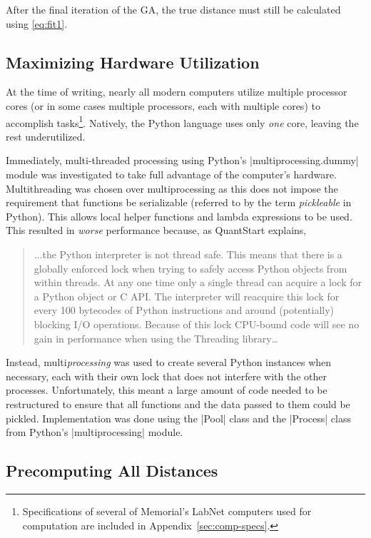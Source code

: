 After the final iteration of the GA, the true distance must still be calculated
using \eqref{eq:fit1}.

\subsection{Maximizing Hardware Utilization}
At the time of writing, nearly all modern computers utilize multiple processor
cores (or in some cases multiple processors, each with multiple cores) to 
accomplish tasks\footnote{Specifications of several of Memorial's LabNet 
computers used for computation are included in Appendix~\ref{sec:comp-specs}.}.
Natively, the Python language uses only {\em one} core, leaving the rest 
underutilized. 

Immediately, multi-threaded processing using Python's 
|multiprocessing.dummy| module was investigated to take full 
advantage of the computer's hardware. Multithreading was chosen over
multiprocessing as this does not impose the requirement that functions 
be serializable (referred to by the term {\em pickleable} in Python). This 
allows local helper functions and lambda expressions to be used.
This resulted in {\em worse} performance because, as QuantStart explains,
\begin{quote}
	...the Python interpreter is not thread safe. This means that there is a
	globally enforced lock when trying to safely access Python objects from 
	within threads. At any one time only a single thread can acquire a lock 
	for a Python object or C API. The interpreter will reacquire this lock for 
	every 100 bytecodes of Python instructions and around (potentially) 
	blocking I/O operations. Because of this lock CPU-bound code will see 
	no gain in performance when using the Threading library\ldots
	\cite{quantstart}
\end{quote}
Instead, multi{\em processing} was used to create several Python instances
when necessary, each with their own lock that does not interfere with the
other processes. Unfortunately, this meant a large amount of code needed
to be restructured to ensure that all functions and the data passed to them
could be pickled. Implementation was done using the |Pool| class and the
|Process| class from Python's |multiprocessing| module.






\subsection{Precomputing All Distances}\label{ssec:precomputing}

